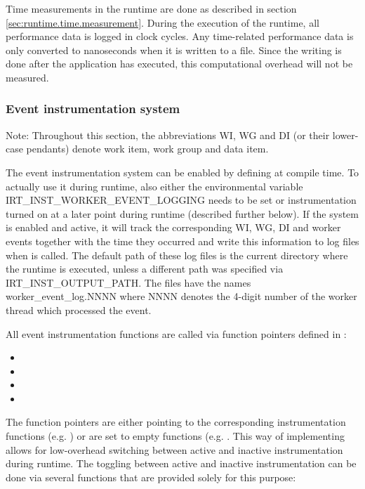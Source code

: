 Time measurements in the runtime are done as described in section
\ref{sec:runtime.time.measurement}. During the execution of the runtime, all
performance data is logged in clock cycles. Any time-related performance data is
only converted to nanoseconds when it is written to a file. Since the writing is
done after the application has executed, this computational overhead will not be
measured.

\subsubsection{Event instrumentation system}

Note: Throughout this section, the abbreviations WI, WG and DI (or their
lower-case pendants) denote work item, work group and data item.

The event instrumentation system can be enabled by defining
 at compile time. To actually use it
during runtime, also either the environmental variable
IRT\_INST\_WORKER\_EVENT\_LOGGING needs to be set or instrumentation turned on
at a later point during runtime (described further below). If the system is
enabled and active, it will track the corresponding WI, WG, DI and worker events
together with the time they occurred and write this information to log files
when  is called. The default path of these log
files is the current directory where the runtime is executed, unless a different
path was specified via IRT\_INST\_OUTPUT\_PATH. The files have the names
worker\_event\_log.NNNN where NNNN denotes the 4-digit number of the worker
thread which processed the event.

All event instrumentation functions are called via function pointers defined in
:

\begin{itemize} 
	\item {} 
	\item {} 
	\item {} 
	\item {} 
\end{itemize}

The function pointers are either pointing to the corresponding instrumentation
functions (e.g. ) or are set to
empty functions (e.g. . This way
of implementing allows for low-overhead switching between active and inactive
instrumentation during runtime. The toggling between active and inactive
instrumentation can be done via several functions that are provided solely for
this purpose:

